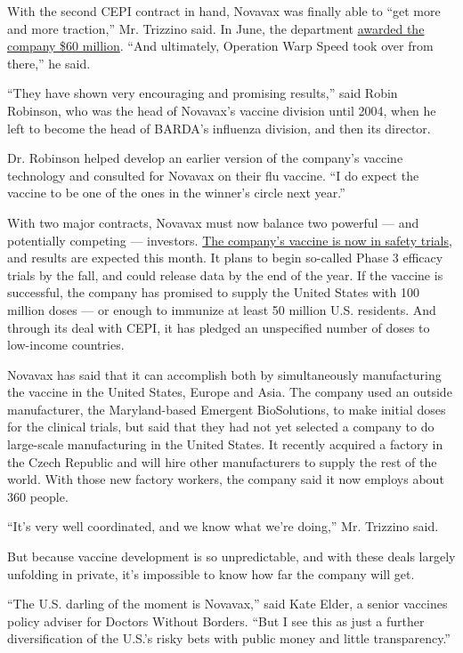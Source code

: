 With the second CEPI contract in hand, Novavax was finally able to ``get
more and more traction,'' Mr. Trizzino said. In June, the department
\href{https://ir.novavax.com/news-releases/news-release-details/novavax-awarded-department-defense-contract-covid-19-vaccine}{awarded
the company \$60 million}. ``And ultimately, Operation Warp Speed took
over from there,'' he said.

``They have shown very encouraging and promising results,'' said Robin
Robinson, who was the head of Novavax's vaccine division until 2004,
when he left to become the head of BARDA's influenza division, and then
its director.

Dr. Robinson helped develop an earlier version of the company's vaccine
technology and consulted for Novavax on their flu vaccine. ``I do expect
the vaccine to be one of the ones in the winner's circle next year.''

With two major contracts, Novavax must now balance two powerful --- and
potentially competing --- investors.
\href{https://www.nytimes3xbfgragh.onion/interactive/2020/science/coronavirus-vaccine-tracker.html}{The
company's vaccine is now in safety trials}, and results are expected
this month. It plans to begin so-called Phase 3 efficacy trials by the
fall, and could release data by the end of the year. If the vaccine is
successful, the company has promised to supply the United States with
100 million doses --- or enough to immunize at least 50 million U.S.
residents. And through its deal with CEPI, it has pledged an unspecified
number of doses to low-income countries.

Novavax has said that it can accomplish both by simultaneously
manufacturing the vaccine in the United States, Europe and Asia. The
company used an outside manufacturer, the Maryland-based Emergent
BioSolutions, to make initial doses for the clinical trials, but said
that they had not yet selected a company to do large-scale manufacturing
in the United States. It recently acquired a factory in the Czech
Republic and will hire other manufacturers to supply the rest of the
world. With those new factory workers, the company said it now employs
about 360 people.

``It's very well coordinated, and we know what we're doing,'' Mr.
Trizzino said.

But because vaccine development is so unpredictable, and with these
deals largely unfolding in private, it's impossible to know how far the
company will get.

``The U.S. darling of the moment is Novavax,'' said Kate Elder, a senior
vaccines policy adviser for Doctors Without Borders. ``But I see this as
just a further diversification of the U.S.'s risky bets with public
money and little transparency.''

